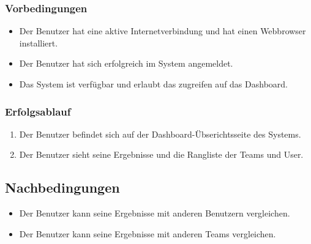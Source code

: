 \subsubsection*{Vorbedingungen}

\begin{itemize}
  \item Der Benutzer hat eine aktive Internetverbindung und hat einen Webbrowser installiert.
  \item Der Benutzer hat sich erfolgreich im System angemeldet.
  \item Das System ist verfügbar und erlaubt das zugreifen auf das Dashboard.
\end{itemize}

\subsubsection*{Erfolgsablauf}

\begin{enumerate}
  \item Der Benutzer befindet sich auf der Dashboard-Übserichtsseite des Systems.
  \item Der Benutzer sieht seine Ergebnisse und die Rangliste der Teams und User.
\end{enumerate}

\subsection*{Nachbedingungen}

\begin{itemize}
  \item Der Benutzer kann seine Ergebnisse mit anderen Benutzern vergleichen.
  \item Der Benutzer kann seine Ergebnisse mit anderen Teams vergleichen.
\end{itemize}